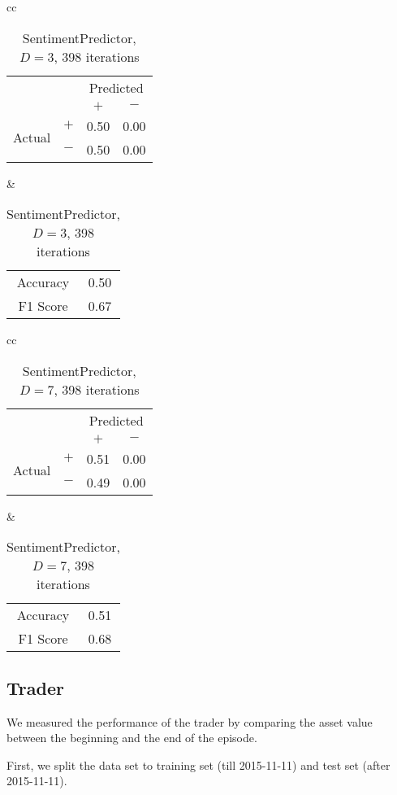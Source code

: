 \documentclass[twocolumn,10pt]{asme2ej}
\begin{document}
\begin{table}
  \begin{tabular}{cc}
    \begin{tabular}{cc|cc}
      & & \multicolumn{2}{c}{Predicted} \\
      & & $+ $ & $-$ \\
      \hline
      \multirow{2}{*}{Actual}
      & $+$ & 0.50 & 0.00 \\
      & $-$ & 0.50 & 0.00 \\
      \hline
    \end{tabular}
    &
    \begin{tabular}{cc}
      Accuracy & 0.50 \\
      F1 Score & 0.67 \\
    \end{tabular}
  \end{tabular}
  \caption{SentimentPredictor, $D=3$, 398 iterations}
  \label{pred-perf-SentimentPredictor-3-398}
\end{table}


\begin{table}
  \begin{tabular}{cc}
    \begin{tabular}{cc|cc}
      & & \multicolumn{2}{c}{Predicted} \\
      & & $+ $ & $-$ \\
      \hline
      \multirow{2}{*}{Actual}
      & $+$ & 0.51 & 0.00 \\
      & $-$ & 0.49 & 0.00 \\
      \hline
    \end{tabular}
    &
    \begin{tabular}{cc}
      Accuracy & 0.51 \\
      F1 Score & 0.68 \\
    \end{tabular}
  \end{tabular}
  \caption{SentimentPredictor, $D=7$, 398 iterations}
  \label{pred-perf-SentimentPredictor-7-398}
\end{table}

\subsection{Trader}

We measured the performance of the trader by comparing the asset value between
the beginning and the end of the episode.

First, we split the data set to training set (till 2015-11-11) and
test set (after 2015-11-11).
\end{document}
